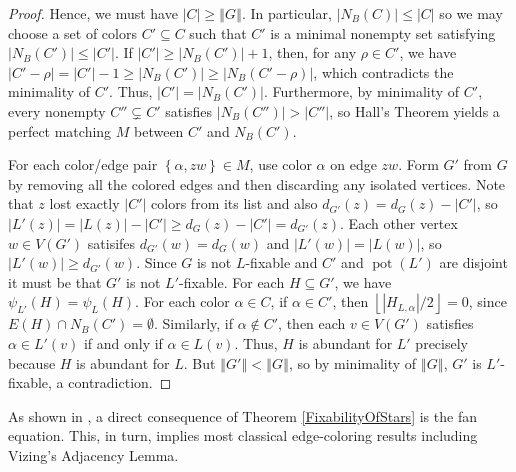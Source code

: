 \documentclass[12pt]{article}
\theoremstyle{plain}
\theoremstyle{definition}
\theoremstyle{remark}
\newcommand{\set}[1]{\left\{ #1 \right\}}
\newcommand{\card}[1]{\left|#1\right|}
\newcommand{\size}[1]{\left\Vert#1\right\Vert}
\newcommand{\floor}[1]{\left\lfloor#1\right\rfloor}
\newcommand{\pot}{\operatorname{pot}}
\begin{document}
\begin{proof}
Hence, we must have $|C| \ge \size{G}$.  In particular, $\card{N_B(C)} \le |C|$
so we may choose a set of colors $C' \subseteq C$ such that $C'$ is a minimal
nonempty set satisfying $\card{N_B(C')} \le \card{C'}$. 
If $|C'|\ge |N_B(C')|+1$, then, for any $\rho\in C'$, we have
$\card{C'-\rho}=\card{C'}-1\ge\card{N_B(C')}\ge\card{N_B(C'-\rho)}$, which
contradicts the minimality of $C'$.  Thus, $\card{C'}=\card{N_B(C')}$.
Furthermore, by minimality of $C'$, every nonempty $C''\subsetneq C'$ satisfies
$\card{N_B(C'')}>\card{C''}$, so Hall's Theorem yields a perfect matching $M$
between $C'$ and $N_B(C')$.

For each color/edge pair
$\set{\alpha, zw} \in M$, use color $\alpha$ on edge $zw$.  Form $G'$ from $G$
by removing all the colored edges and then discarding any isolated vertices.
Note that $z$ lost exactly $\card{C'}$ colors from its list and also
$d_{G'}(z)=d_G(z)-\card{C'}$, so $\card{L'(z)}=\card{L(z)}-\card{C'}\ge
d_G(z)-\card{C'}=d_{G'}(z)$.  Each other vertex $w\in V(G')$ satisifes
$d_{G'}(w)=d_G(w)$ and $\card{L'(w)}=\card{L(w)}$, so $\card{L'(w)}\ge
d_{G'}(w)$.
Since $G$ is not $L$-fixable and $C'$ and $\pot(L')$ are disjoint it must be
that $G'$ is not $L'$-fixable.  
For each $H \subseteq G'$, we have $\psi_{L'}(H) = \psi_{L}(H)$.
For each color $\alpha\in C$, if $\alpha\in C'$, then
$\floor{\card{H_{L,\alpha}}/2}=0$, since $E(H)\cap N_B(C')=\emptyset$.
Similarly, if $\alpha\notin C'$, then each $v\in V(G')$ satisfies $\alpha\in
L'(v)$ if and only if $\alpha\in L(v)$.
Thus, $H$ is abundant for $L'$ precisely because $H$ is abundant for $L$.
But $\size{G'} < \size{G}$, so by minimality of $\size{G}$, $G'$ is
$L'$-fixable, a contradiction.
\end{proof}

As shown in \cite{HallGame}, 
a direct consequence of Theorem \ref{FixabilityOfStars} is the {fan equation}. 
This, in turn, implies most classical edge-coloring results including Vizing's
Adjacency Lemma.
\end{document}
